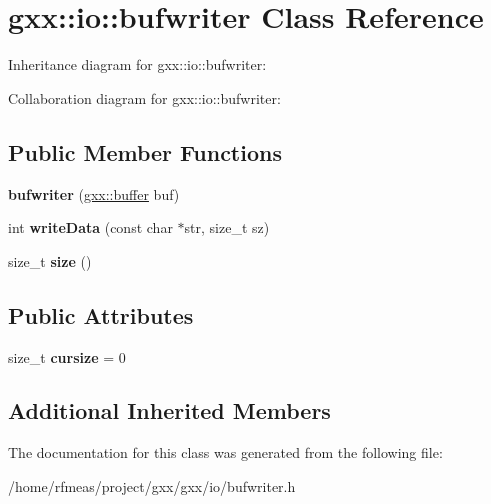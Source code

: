\hypertarget{classgxx_1_1io_1_1bufwriter}{}\section{gxx\+:\+:io\+:\+:bufwriter Class Reference}
\label{classgxx_1_1io_1_1bufwriter}


Inheritance diagram for gxx\+:\+:io\+:\+:bufwriter\+:


Collaboration diagram for gxx\+:\+:io\+:\+:bufwriter\+:
\subsection*{Public Member Functions}
\begin{DoxyCompactItemize}
\item 
{\bfseries bufwriter} (\hyperlink{classgxx_1_1buffer}{gxx\+::buffer} buf)\hypertarget{classgxx_1_1io_1_1bufwriter_a5b300f0fd662417ebbbac62e948437ce}{}\label{classgxx_1_1io_1_1bufwriter_a5b300f0fd662417ebbbac62e948437ce}

\item 
int {\bfseries write\+Data} (const char $\ast$str, size\+\_\+t sz)\hypertarget{classgxx_1_1io_1_1bufwriter_aad34a02b76fbc5f6abfad4f59bc76262}{}\label{classgxx_1_1io_1_1bufwriter_aad34a02b76fbc5f6abfad4f59bc76262}

\item 
size\+\_\+t {\bfseries size} ()\hypertarget{classgxx_1_1io_1_1bufwriter_aee941af370762885650fb7a07fe5ab20}{}\label{classgxx_1_1io_1_1bufwriter_aee941af370762885650fb7a07fe5ab20}

\end{DoxyCompactItemize}
\subsection*{Public Attributes}
\begin{DoxyCompactItemize}
\item 
size\+\_\+t {\bfseries cursize} = 0\hypertarget{classgxx_1_1io_1_1bufwriter_af587a495c8a8cf990589469d93fbd0bb}{}\label{classgxx_1_1io_1_1bufwriter_af587a495c8a8cf990589469d93fbd0bb}

\end{DoxyCompactItemize}
\subsection*{Additional Inherited Members}


The documentation for this class was generated from the following file\+:\begin{DoxyCompactItemize}
\item 
/home/rfmeas/project/gxx/gxx/io/bufwriter.\+h\end{DoxyCompactItemize}
